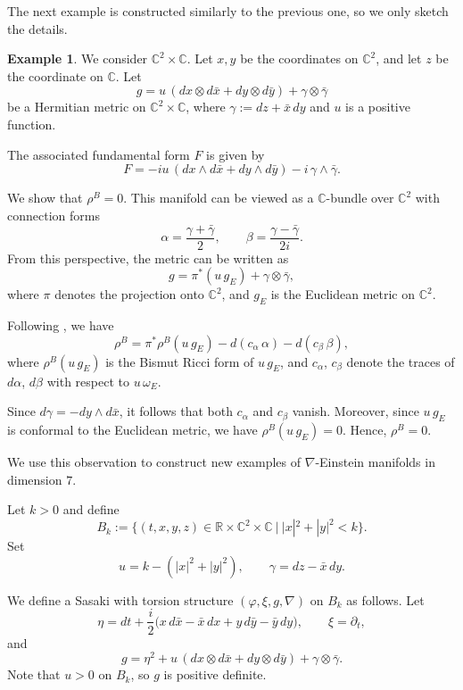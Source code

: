 \documentclass{article}
\theoremstyle{definition}
\newtheorem{ex}[thm]{Example}
\renewcommand{\phi}{\varphi}
\numberwithin{equation}{section}
\begin{document}
The next example is constructed similarly to the previous one, so we only sketch the details. 
\begin{ex}
We consider \(\mathbb{C}^2 \times \mathbb{C}\). Let \(x,y\) be the coordinates on \(\mathbb{C}^2\), and let \(z\) be the coordinate on \(\mathbb{C}\).
Let
\[
g = u \,(dx \otimes d\bar{x} + dy \otimes d\bar{y}) + \gamma \otimes \bar{\gamma}
\]
be a Hermitian metric on \(\mathbb{C}^2 \times \mathbb{C}\), where \(\gamma := dz + \bar{x} \,dy\) and $u$ is a positive function.

The associated fundamental form \(F\) is given by
\[
F = -iu \,(dx \wedge d\bar{x} + dy \wedge d\bar{y}) - i\,\gamma \wedge \bar{\gamma}.
\]

We show that \(\rho^B = 0\). This manifold can be viewed as a \(\mathbb{C}\)-bundle over \(\mathbb{C}^2\) with connection forms
\[
\alpha = \frac{\gamma + \bar{\gamma}}{2},
\qquad
\beta = \frac{\gamma - \bar{\gamma}}{2i}.
\]
From this perspective, the metric can be written as
\[
g = \pi^*(u\, g_E) + \gamma \otimes \bar{\gamma},
\]
where \(\pi\) denotes the projection onto \(\mathbb{C}^2\), and \(g_E\) is the Euclidean metric on \(\mathbb{C}^2\).

Following \cite{GGP}, we have
\[
\rho^B = \pi^* \rho^B(u \, g_E) - d(c_\alpha \,\alpha) -d(c_\beta \,\beta),
\]
where \(\rho^B(u \, g_E)\) is the Bismut Ricci form of \(u \, g_E\), and \(c_\alpha\), \(c_\beta\) denote the traces of \(d\alpha\), \(d\beta\) with respect to \( u\, \omega_E\).

Since \(d\gamma = -dy \wedge d\bar{x}\), it follows that both \(c_\alpha\) and \(c_\beta\) vanish. Moreover, since \(u \,g_E\) is conformal to the Euclidean metric, we have \(\rho^B(u\,g_E) = 0\). Hence, \(\rho^B = 0\).

We use this observation to construct new examples of \(\nabla\)-Einstein manifolds in dimension \(7\). \par \medskip

Let \(k>0\) and define
\[
B_k := \{(t,x,y,z) \in \mathbb{R} \times \mathbb{C}^2 \times \mathbb{C} \ | \ |x|^2 + |y|^2 < k \}.
\]
Set
\[
u = k - (|x|^2 + |y|^2),
\qquad
\gamma = dz - \bar{x}\,dy.
\]

We define a Sasaki with torsion structure \((\phi,\xi,g,\nabla)\) on \(B_k\) as follows. Let
\[
\eta = dt + \frac{i}{2}\big(x \, d\bar{x} - \bar{x}\, dx + y\, d\bar{y} - \bar{y}\, dy\big),
\qquad
\xi = \partial_t,
\]
and
\[
g = \eta^2 + u\,(dx \otimes d\bar{x} + dy \otimes d\bar{y}) + \gamma \otimes \bar{\gamma}.
\]
Note that $u>0$ on $B_k$, so \(g\) is positive definite.


\end{ex}
\end{document}
